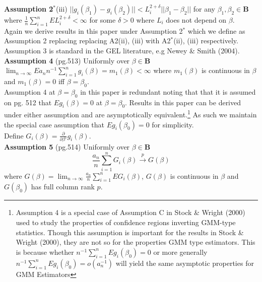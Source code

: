 \documentclass[11pt, fleqn]{article}
\begin{document}
\textbf{Assumption 2$^*$}(iii)
$|\!|g_{i}(\beta_1)-g_{i}(\beta_2)|\!|<L_{i}^{2+\delta}|\!|\beta_1-\beta_2|\!|$  for any $\beta_1,\beta_2\in \mathbf{B}$ where $\frac{1}{n}\sum_{i=1}^n EL_{i}^{2+\delta}<\infty$ for some $\delta>0$ where $L_{i}$ does not depend on $\beta$.\\

Again we derive results in this paper under Assumption 2$^*$ which we define as Assumption 2 replacing 
 replacing A2(ii), (iii) with A2$^*$(ii), (iii) respectively.\\

Assumption 3 is standard in the GEL literature, e.g Newey \& Smith (2004).\\

  \textbf{Assumption 4} (pg.513) Uniformly over $\beta \in \mathbf{B}$ $\lim_{n\rightarrow \infty} Ea_nn^{-1}\sum_{i=1}^n g_i(\beta)= m_1(\beta)<\infty$ where $m_1(\beta)$ is continuous in $\beta$ and $m_1(\beta)=0$ iff $\beta=\beta_0$.\\
  
  Assumption 4 at $\beta=\beta_0$ in this paper  is redundant noting that 
 that it is assumed on pg. 512 that $Eg_i(\beta)=0$ at $\beta=\beta_0$. Results  in this paper can be derived under either assumption and are asymptotically equivalent.\footnote{ Assumption 4 is a special case of Assumption C in  Stock \& Wright (2000) used to study the properties of confidence regions inverting GMM-type statistics. Though this assumption is important for the results in Stock \& Wright (2000), they are not so for the properties GMM type estimators. This is because whether $ n^{-1}\sum_{i=1}^nEg_i(\beta_0)=0$ or more generally $n^{-1}\sum_{i=1}^nEg_i(\beta_0)= o(a_n^{-1})$ 	 will yield the same asymptotic properties for GMM Estimators} As such we maintain the special case assumption that $Eg_i(\beta_0)=0$ for simplicity.\\
 	
Define $G_i(\beta)=\frac{\partial}{\partial \beta'}g_i(\beta)$.\\

  \textbf{Assumption 5} (pg.514) Uniformly over $\beta \in \mathbf{B}$
  \begin{equation}\label{G} \frac{a_n}{n} \sum_{i=1}^n G_i(\beta)\overset{p}{\rightarrow} G(\beta) \end{equation}
  where $G(\beta)=\lim_{n\rightarrow \infty} \frac{a_n}{n} \sum_{i=1}^nEG_i(\beta)$, $G(\beta)$ is continuous in $\beta$ and $G(\beta_0)$ has full column rank $p$.\\
\end{document}
